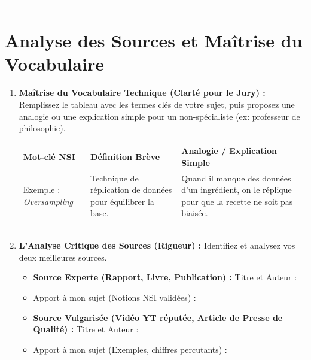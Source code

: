 \vspace{0.5cm}
\hrule
\vspace{0.5cm}

\section{Analyse des Sources et Maîtrise du Vocabulaire}

\begin{enumerate}[label=\textbf{B.\arabic*}]
    \item \textbf{Maîtrise du Vocabulaire Technique (Clarté pour le Jury) :}
    \small Remplissez le tableau avec les termes clés de votre sujet, puis proposez une analogie ou une explication simple pour un non-spécialiste (ex: professeur de philosophie).
    \normalsize
    \begin{center}
    \begin{tabular}{|>{\centering\arraybackslash}m{3cm}|m{4cm}|m{7.5cm}|}
    \hline
    \textbf{Mot-clé NSI} & \textbf{Définition Brève} & \textbf{Analogie / Explication Simple} \\
    \hline
    \small Exemple : \emph{Oversampling} & \small Technique de réplication de données pour équilibrer la base. & \small Quand il manque des données d'un ingrédient, on le réplique pour que la recette ne soit pas biaisée. \\
    \hline
    \dotfill & \dotfill & \dotfill \\
    \hline
    \dotfill & \dotfill & \dotfill \\
    \hline
    \dotfill & \dotfill & \dotfill \\
    \hline
    \end{tabular}
    \end{center}

    \item \textbf{L'Analyse Critique des Sources (Rigueur) :}
    \small Identifiez et analysez vos deux meilleures sources.
    \normalsize
    \begin{itemize}[label=--]
        \item \textbf{Source Experte (Rapport, Livre, Publication) :} Titre et Auteur : \dotfill
        \item Apport à mon sujet (Notions NSI validées) : \dotfill
        \item \textbf{Source Vulgarisée (Vidéo YT réputée, Article de Presse de Qualité) :} Titre et Auteur : \dotfill
        \item Apport à mon sujet (Exemples, chiffres percutants) : \dotfill
    \end{itemize}

\end{enumerate}